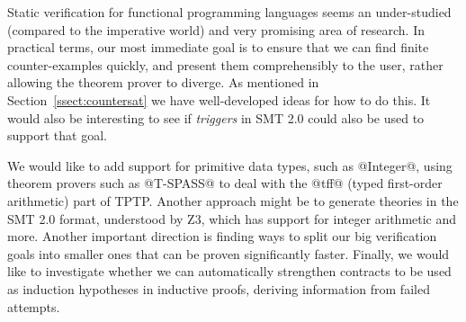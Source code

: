 
Static verification for functional programming languages seems an
under-studied (compared to the imperative world) and very 
promising area of research.
In practical terms, our most immediate goal is to
ensure that we can find finite counter-examples quickly,
and present them comprehensibly to the user, rather allowing the
theorem prover to diverge.
As mentioned in Section~\ref{ssect:countersat} we have well-developed ideas
for how to do this.  It would also be interesting 
to see if \emph{triggers} in SMT 2.0 could also be used to support that goal. 

We would like to add support for primitive data types, such as
@Integer@, using theorem provers such as @T-SPASS@ to deal with the
@tff@ (typed first-order arithmetic) part of TPTP. Another approach might be to
generate theories in the SMT 2.0 format, understood by Z3, which
has support for integer arithmetic and more.  Another important
direction is finding ways to split our big verification goals into
smaller ones that can be proven significantly faster. Finally, we
would like to investigate whether we can automatically strengthen
contracts to be used as induction hypotheses in inductive proofs,
deriving information from failed attempts.

